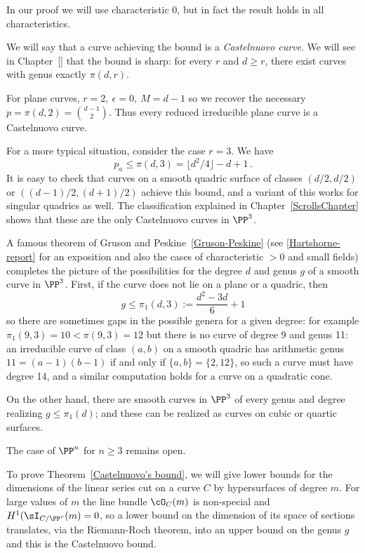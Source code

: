 In our proof we will use characteristic 0, but in fact the result holds in all characteristics.

We will say that a curve achieving the bound is a \emph{Castelnuovo curve}. We will see in Chapter~\ref{} that the bound is sharp: for every $r$ and $d \geq r$, there exist curves with genus exactly $\pi(d,r)$. 

\begin{example}
For plane curves, $r=2, \ \epsilon = 0, \ M = d-1$ so we recover the necessary $p = \pi(d,2) =  {d-1\choose 2}$. Thus every reduced irreducible
plane curve is a Castelnuovo curve.
\end{example}

\begin{example}For a more typical situation, consider the case $r=3$. We have
$$
p_a \leq \pi(d,3) = \lfloor d^2/4 \rfloor-d+1\, .
$$
It is easy to check that curves on a smooth quadric surface of classes
$(d/2, d/2)$ or $((d-1)/2, (d+1)/2)$
achieve this bound, and a variant of this works for singular quadrics as well. The classification  explained in Chapter~\ref{ScrollsChapter}
shows that these are the only Castelnuovo curves in $\PP^3$.
\end{example}

\begin{fact}
A famous theorem of Gruson and Peskine~\ref{Gruson-Peskine} (see \ref{Hartshorne-report} for an exposition and also the cases of characteristic $>0$ and small fields) completes the picture of the possibilities for the degree $d$ and  genus $g$  of a smooth curve in $\PP^3$. First, if the curve does not lie on a plane or a quadric, then
$$
g\leq \pi_1(d,3) := \frac{d^2-3d}{6} +1
$$
so there are  sometimes gaps in the possible genera for a given degree: for example  $\pi_1(9,3) = 10<\pi(9,3) =12$ but there is
no curve of degree 9 and genus 11: an irreducible curve of class $(a,b)$ on a smooth quadric has arithmetic genus $11 = (a-1)(b-1)$
if and only if $\{a,b\} = \{2,12\}$, so such a curve must have degree 14, and a similar computation holds for a curve on a quadratic cone.

On the other hand, there are smooth curves in $\PP^3$ of every genus and degree realizing $g\leq \pi_1(d)$; and these can be realized as curves
on cubic or quartic surfaces.

The case of $\PP^n$ for $n\geq 3$ remains open. 
\end{fact}
To prove Theorem~\ref{Castelnuovo's bound}, we will give lower bounds for the dimensions of the linear series  cut on a curve $C$ by hypersurfaces of degree $m$. For large values of $m$ the line bundle $\cO_C(m)$ is non-special and $H^1(\sI_{C/\PP^r}(m) = 0$, so a lower bound on the dimension of its space of sections translates, via the Riemann-Roch theorem, into an upper bound on the genus $g$ and this is the Castelnuovo bound.

